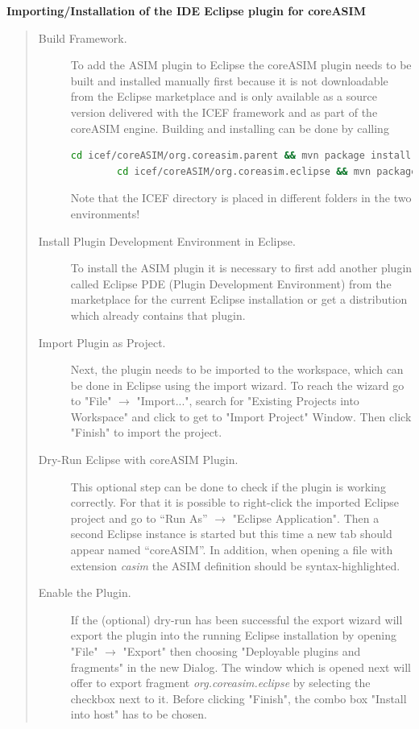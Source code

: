 \textbf{Importing/Installation of the IDE Eclipse plugin for coreASIM}
\begin{quote}
\small
\begin{description}
	\item[Build Framework.] To add the ASIM plugin to Eclipse the coreASIM plugin needs to be built and installed  manually first because it is not downloadable from the Eclipse marketplace and is only available as a source version delivered with the ICEF framework and as part of the coreASIM engine. Building and installing can be done by calling
	\begin{lstlisting}[language=bash]
		cd icef/coreASIM/org.coreasim.parent && mvn package install
		cd icef/coreASIM/org.coreasim.eclipse && mvn package install\end{lstlisting}
	Note that the ICEF directory is placed in different folders in the two environments!
	
	\item[Install Plugin Development Environment in Eclipse.] To install the ASIM plugin it is necessary to first add another plugin called Eclipse PDE (Plugin Development Environment) from the marketplace for the current Eclipse installation or get a distribution which already contains that plugin.
	
	\item[Import Plugin as Project.] Next, the plugin needs to be imported to the workspace, which can be done in Eclipse using the import wizard. To reach the wizard go to "File" $\rightarrow$ "Import...", search for "Existing Projects into Workspace" and click to get to "Import Project" Window. Then click "Finish" to import the project.
	
	\item[Dry-Run Eclipse with coreASIM Plugin.] This optional step can be done to check if the plugin is working correctly. For that it is possible to right-click the imported Eclipse project and go to ``Run As'' $\rightarrow$ "Eclipse Application". Then a second Eclipse instance is started but this time a new tab should appear named ``coreASIM''. In addition, when opening a file with extension \textit{casim} the ASIM definition should be syntax-highlighted.

	\item[Enable the Plugin.] If the (optional) dry-run has been successful the export wizard will export the plugin into the running Eclipse installation by opening "File" $\rightarrow$  "Export" then choosing "Deployable plugins and fragments" in the new Dialog. The window which is opened next will offer to export fragment  \textit{org.coreasim.eclipse} by selecting the checkbox next to it. Before clicking "Finish", the combo box "Install into host" has to be chosen.
\end{description}
\end{quote}

